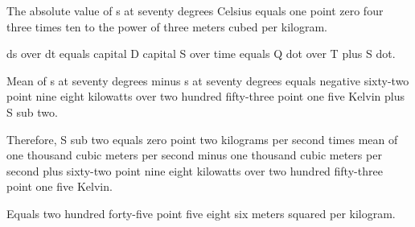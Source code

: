 The absolute value of s at seventy degrees Celsius equals one point zero four three times ten to the power of three meters cubed per kilogram.

ds over dt equals capital D capital S over time equals Q dot over T plus S dot.

Mean of s at seventy degrees minus s at seventy degrees equals negative sixty-two point nine eight kilowatts over two hundred fifty-three point one five Kelvin plus S sub two.

Therefore, S sub two equals zero point two kilograms per second times mean of one thousand cubic meters per second minus one thousand cubic meters per second plus sixty-two point nine eight kilowatts over two hundred fifty-three point one five Kelvin.

Equals two hundred forty-five point five eight six meters squared per kilogram.